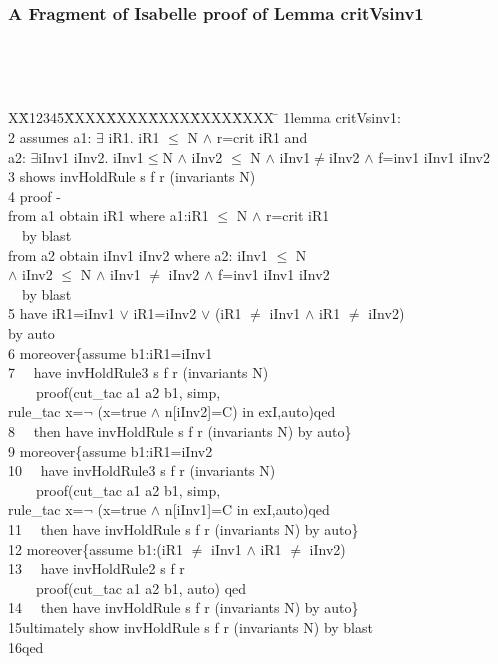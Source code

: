 \documentclass{beamer}
\newlength{\fminilength}
\newenvironment{fmini}[1][\linewidth]
  {\setlength{\fminilength}{#1\fboxsep-2\fboxrule}%
   \vspace{2ex}\noindent\begin{lrbox}{\fminibox}\begin{minipage}{\fminilength}%
   \mbox{ }\hfill\vspace{-2.5ex}}%
  {\end{minipage}\end{lrbox}\vspace{1ex}\hspace{0ex}%
   \framebox{\usebox{\fminibox}}}
\newenvironment{specification}
{\noindent\tiny
\tt\begin{fmini}\begin{tabbing}X\=X12345\=XXXX\=XXXX\=XXXX\=XXXX\=XXXX
\=\+\kill} {\end{tabbing}\normalfont\end{fmini}}
\def \twoSpaces {\ \ }
\def \andc {\wedge }
\def \negc {\neg }
\def \iInv {iInv}
\def \iR {iR}
\begin{document}
\begin{frame}\frametitle{A Fragment of Isabelle proof of Lemma critVsinv1}
\begin{specification}
1lemma critVsinv1:\\
2  assumes  a1: $\exists$ \iR1. \iR1 $\le$ N $\wedge$ r=crit \iR1 and \\
  a2: $\exists$\iInv1 \iInv2. \iInv1$\le$N $\wedge$ \iInv2 $\le$ N $\wedge$ \iInv1$\neq$\iInv2    $\wedge$ f=inv1  \iInv1 \iInv2\\
3  shows  invHoldRule s f r (invariants
  N)\\
4  proof -\\
   from a1 obtain \iR1 where a1:\iR1 $\le$ N $\wedge$ r=crit \iR1 \\
\twoSpaces   by blast\\
   from a2 obtain \iInv1 \iInv2 where a2: \iInv1 $\le$ N \\
   $\wedge$ \iInv2 $\le$ N $\wedge$ \iInv1 $\neq$ \iInv2 $\wedge$ f=inv1  \iInv1 \iInv2\\
\twoSpaces   by blast \\
5  have iR1=\iInv1 $\vee$ \iR1=\iInv2 $\vee$ (\iR1 $\ne$ \iInv1 $\wedge$  \iR1 $\ne$ \iInv2) \\
  by auto\\

6  moreover\{assume  b1:\iR1=\iInv1\\
7  \twoSpaces have invHoldRule3 s f r (invariants N)\\
 \twoSpaces  \twoSpaces   proof(cut\_tac a1 a2 b1, simp, \\
 rule\_tac x=$\negc$ (x=true $\andc$ n[\iInv2]=C)  in exI,auto)qed\\
8  \twoSpaces then have invHoldRule s f r
(invariants
  N)
by auto\}\\

9  moreover\{assume  b1:iR1=\iInv2\\
10 \twoSpaces have invHoldRule3 s f r (invariants N)\\
 \twoSpaces \twoSpaces   proof(cut\_tac a1 a2 b1, simp, \\
 rule\_tac x=$\negc$ (x=true $\andc$ n[\iInv1]=C  in exI,auto)qed\\
11 \twoSpaces then have invHoldRule s f r (invariants
  N)
by auto\}\\

12   moreover\{assume  b1:(\iR1 $\ne$  \iInv1 $\wedge$   \iR1 $\ne$  \iInv2)\\
13 \twoSpaces have invHoldRule2 s f r  \\
  \twoSpaces \twoSpaces  proof(cut\_tac a1 a2 b1,  auto) qed\\
14 \twoSpaces then have invHoldRule s f r
(invariants
  N)
by auto\} \\

15ultimately show invHoldRule s f r
(invariants N) by blast\\
16qed\\
\end{specification}
\end{frame}
\end{document}
